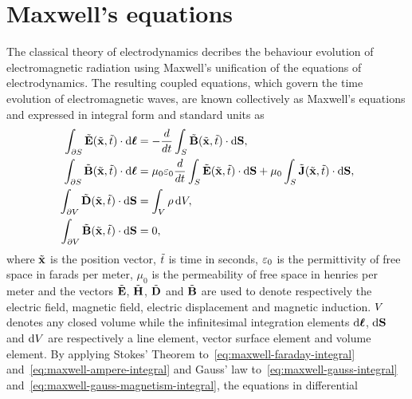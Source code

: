 \section{Maxwell's equations}
The classical theory of electrodynamics decribes the behaviour evolution of
electromagnetic radiation using Maxwell's unification of the equations of
electrodynamics\cite{Balanis:ui,Jackson:490457}. The resulting coupled
equations, which govern the time evolution of electromagnetic waves, are known
collectively as Maxwell's equations and expressed in integral form and standard
units as
\begin{subequations}
  \begin{align}
    \int_{\partial S} \tilde{\mathbf{E}}(\tilde{\mathbf{x}},\tilde{t}) \cdot \mathrm{d}\boldsymbol{\ell}  &= - \frac{d}{dt} \int_{S} \tilde{\mathbf{B}}(\tilde{\mathbf{x}},\tilde{t}) \cdot \mathrm{d}\mathbf{S}, \label{eq:maxwell-faraday-integral} \\
    \int_{\partial S} \tilde{\mathbf{B}}(\tilde{\mathbf{x}},\tilde{t}) \cdot \mathrm{d}\boldsymbol{\ell} &= \mu_0 \varepsilon_0 \frac{d}{dt} \int_{S} \tilde{\mathbf{E}}(\tilde{\mathbf{x}},\tilde{t}) \cdot \mathrm{d}\mathbf{S} +  \mu_0 \int_{S} \tilde{\mathbf{J}}(\tilde{\mathbf{x}},\tilde{t}) \cdot \mathrm{d}\mathbf{S}, \label{eq:maxwell-ampere-integral} \\
    \int_{\partial V} \tilde{\mathbf{D}}(\tilde{\mathbf{x}},\tilde{t})\cdot\mathrm{d}\mathbf{S} &= \int_V \rho \,\mathrm{d}V, \label{eq:maxwell-gauss-integral} \\
    \int_{\partial V} \tilde{\mathbf{B}}(\tilde{\mathbf{x}},\tilde{t})\cdot\mathrm{d}\mathbf{S} &= 0, \label{eq:maxwell-gauss-magnetism-integral}
  \end{align}
\end{subequations}
where $\tilde{\mathbf{x}}$ is the position vector, $\tilde{t}$ is time in seconds, $\varepsilon_0$
is the permittivity of free space in farads per meter, $\mu_0$ is the
permeability of free space in henries per meter and the vectors
$\tilde{\mathbf{E}}$, $\tilde{\mathbf{H}}$, $\tilde{\mathbf{D}}$ and $\tilde{\mathbf{B}}$ are used to denote respectively
the electric field, magnetic field, electric displacement and magnetic
induction. %
$V$ denotes any closed volume while the infinitesimal integration elements
$\mathrm{d}\boldsymbol{\ell}$, $\mathrm{d}\mathbf{S}$ and $\mathrm{d}V$ are respectively a line element, vector surface
element and volume element.
By applying Stokes' Theorem to~\eqref{eq:maxwell-faraday-integral}
and~\eqref{eq:maxwell-ampere-integral} and Gauss' law
to~\eqref{eq:maxwell-gauss-integral}
and~\eqref{eq:maxwell-gauss-magnetism-integral}, the equations in differential
